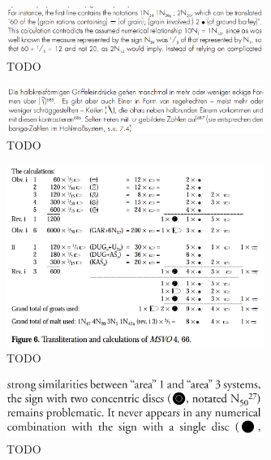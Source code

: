 \documentclass[10pt, a4paper, twoside]{article}
\begin{document}
\begin{figure}
  \begin{center}
  \includegraphics[width=0.75\textwidth]{englund-116.png}
  \caption{TODO \cite[116]{Englund1998}\label{englund116}}
  \end{center}
\end{figure}
\begin{figure}
  \begin{center}
  \includegraphics[width=0.75\textwidth]{krebernik-303.png}
  \caption{TODO \cite[303]{Krebernik1998}\label{krebernik303}}
  \end{center}
\end{figure}
\begin{figure}
  \begin{center}
  \includegraphics[width=0.75\textwidth]{englund-15.png}
  \caption{TODO \cite[132]{Englund2001}\label{englund15}}
  \end{center}
\end{figure}
\begin{figure}
  \begin{center}
  \includegraphics[width=0.75\textwidth]{chambon-6.png}
  \caption{TODO \cite[6]{Chambon2003}\label{chambon6}}
  \end{center}
\end{figure}
\end{document}
